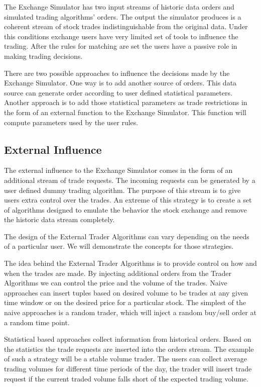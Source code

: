 \documentclass{article}
\begin{document}
The Exchange Simulator has two input streams of historic data orders and simulated trading algorithms' orders. The output the simulator produces is a coherent stream of stock trades indistinguishable from the original data. Under this conditions exchange users have very limited set of tools to influence the trading. After the rules for matching are set the users have a passive role in making trading decisions. 

There are two possible approaches to influence the decisions made by the Exchange Simulator. One way is to add another source of orders. This data source can generate order according to user defined statistical parameters. Another approach is to add those statistical parameters as trade restrictions in the form of an external function to the Exchange Simulator. This function will compute parameters used by the user rules.

\subsection{External Influence}

The external influence to the Exchange Simulator comes in the form of an additional stream of trade requests. The incoming requests can be generated by a user defined dummy trading algorithm. The purpose of this stream is to give users extra control over the trades. An extreme of this strategy is to create a set of algorithms designed to emulate the behavior the stock exchange and remove the historic data stream completely. 

The design of the External Trader Algorithms can vary depending on the needs of a particular user. We will demonstrate the concepts for those strategies.

The idea behind the External Trader Algorithms is to provide control on how and when the trades are made. By injecting additional orders from the Trader Algorithms we can control the price and the volume of the trades. Naive approaches can insert tuples based on desired volume to be trades at any given time window or on the desired price for a particular stock. The simplest of the naive approaches is a random trader, which will inject a random buy/sell order at a random time point.  

Statistical based approaches collect information from historical orders. Based on the statistics the trade requests are inserted into the orders stream. The example of such a strategy will be a stable volume trader. The users can collect average trading volumes for different time periods of the day, the trader will insert trade request if the current traded volume falls short of the expected trading volume.
\end{document}
